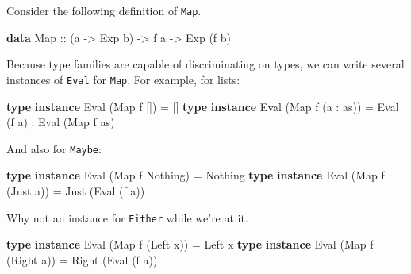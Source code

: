 \documentclass[
  11pt,
]{book}
\newenvironment{Shaded}{}{}
\newcommand{\CharTok}[1]{\textcolor[rgb]{0.25,0.44,0.63}{#1}}
\newcommand{\DataTypeTok}[1]{\textcolor[rgb]{0.56,0.13,0.00}{#1}}
\newcommand{\KeywordTok}[1]{\textcolor[rgb]{0.00,0.44,0.13}{\textbf{#1}}}
\newcommand{\NormalTok}[1]{#1}
\newcommand{\OperatorTok}[1]{\textcolor[rgb]{0.40,0.40,0.40}{#1}}
\newcommand{\OtherTok}[1]{\textcolor[rgb]{0.00,0.44,0.13}{#1}}
\theoremstyle{nonumberplain}
\begin{document}
Consider the following definition of \texttt{Map}.

\begin{Shaded}
\begin{Highlighting}[]
\KeywordTok{data} \DataTypeTok{Map}\OtherTok{ ::}\NormalTok{ (a }\OtherTok{{-}\textgreater{}} \DataTypeTok{Exp}\NormalTok{ b) }\OtherTok{{-}\textgreater{}}\NormalTok{ f a }\OtherTok{{-}\textgreater{}} \DataTypeTok{Exp}\NormalTok{ (f b)}
\end{Highlighting}
\end{Shaded}

Because type families are capable of discriminating on types, we can
write several instances of \texttt{Eval} for \texttt{Map}. For example,
for lists:

\begin{Shaded}
\begin{Highlighting}[]
\KeywordTok{type} \KeywordTok{instance} \DataTypeTok{Eval}\NormalTok{ (}\DataTypeTok{Map}\NormalTok{ f }\CharTok{\textquotesingle{}[]) = \textquotesingle{}}\NormalTok{[]}
\KeywordTok{type} \KeywordTok{instance} \DataTypeTok{Eval}\NormalTok{ (}\DataTypeTok{Map}\NormalTok{ f (a }\CharTok{\textquotesingle{}: as)) = Eval (f a) \textquotesingle{}}\OperatorTok{:} \DataTypeTok{Eval}\NormalTok{ (}\DataTypeTok{Map}\NormalTok{ f as)}
\end{Highlighting}
\end{Shaded}

And also for \texttt{Maybe}:

\begin{Shaded}
\begin{Highlighting}[]
\KeywordTok{type} \KeywordTok{instance} \DataTypeTok{Eval}\NormalTok{ (}\DataTypeTok{Map}\NormalTok{ f }\DataTypeTok{\textquotesingle{}Nothing}\NormalTok{)  }\OtherTok{=} \DataTypeTok{\textquotesingle{}Nothing}
\KeywordTok{type} \KeywordTok{instance} \DataTypeTok{Eval}\NormalTok{ (}\DataTypeTok{Map}\NormalTok{ f (}\DataTypeTok{\textquotesingle{}Just}\NormalTok{ a)) }\OtherTok{=} \DataTypeTok{\textquotesingle{}Just}\NormalTok{ (}\DataTypeTok{Eval}\NormalTok{ (f a))}
\end{Highlighting}
\end{Shaded}

Why not an instance for \texttt{Either} while we're at it.

\begin{Shaded}
\begin{Highlighting}[]
\KeywordTok{type} \KeywordTok{instance} \DataTypeTok{Eval}\NormalTok{ (}\DataTypeTok{Map}\NormalTok{ f (}\DataTypeTok{\textquotesingle{}Left}\NormalTok{ x))  }\OtherTok{=} \DataTypeTok{\textquotesingle{}Left}\NormalTok{ x}
\KeywordTok{type} \KeywordTok{instance} \DataTypeTok{Eval}\NormalTok{ (}\DataTypeTok{Map}\NormalTok{ f (}\DataTypeTok{\textquotesingle{}Right}\NormalTok{ a)) }\OtherTok{=} \DataTypeTok{\textquotesingle{}Right}\NormalTok{ (}\DataTypeTok{Eval}\NormalTok{ (f a))}
\end{Highlighting}
\end{Shaded}
\end{document}
